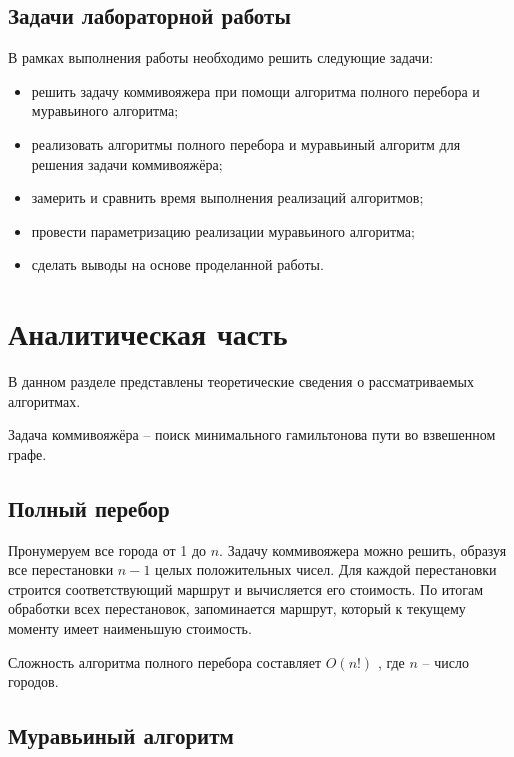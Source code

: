 \documentclass[12pt]{report}
\begin{document}
\section*{Задачи лабораторной работы}
	
В рамках выполнения работы необходимо решить следующие задачи:
	
\begin{itemize}
	\item решить задачу коммивояжера при помощи алгоритма полного перебора и муравьиного алгоритма;
	\item реализовать алгоритмы полного перебора и муравьиный алгоритм для решения задачи коммивояжёра;
	\item замерить и сравнить время выполнения реализаций алгоритмов;
	\item провести параметризацию реализации муравьиного алгоритма;
	\item сделать выводы на основе проделанной работы.
\end{itemize}

\chapter{Аналитическая часть}
	
В данном разделе представлены теоретические сведения о рассматриваемых алгоритмах.

Задача коммивояжёра -- поиск минимального гамильтонова пути во взвешенном графе.

\section{Полный перебор}

Пронумеруем все города от 1 до $n$. Задачу коммивояжера можно решить, образуя все перестановки $n-1$ целых положительных чисел. Для каждой перестановки строится соответствующий маршрут и вычисляется его стоимость. По итогам обработки всех перестановок, запоминается маршрут, который к текущему моменту имеет наименьшую стоимость.


Сложность алгоритма полного перебора составляет $O(n!)$ \cite{goodman}, где $n$ -- число городов.
	
\section{Муравьиный алгоритм}
\end{document}
